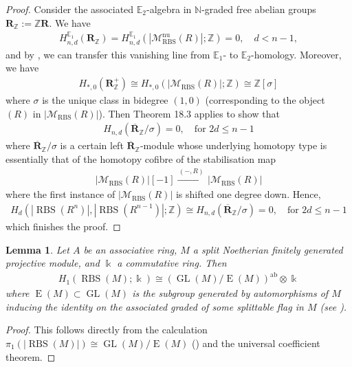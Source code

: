 \documentclass[12pt, reqno]{amsart}
\theoremstyle{plain}
\newtheorem{lemma}[theorem]{Lemma}
\theoremstyle{definition}
\newcommand{\N}{\mathbb N}
\newcommand{\Z}{\mathbb Z}
\begin{document}
\begin{proof}
Consider the associated $\mathbb{E}_2$-algebra in $\N$-graded free abelian groups $\mathbf{R}_\Z:=\Z\mathbf{R}$. We have
\begin{align*}
H_{n,d}^{\mathbb{E}_1}(\mathbf{R}_\Z)=H_{n,d}^{\mathbb{E}_1}(|\mathscr{M}_{\operatorname{RBS}}^{\operatorname{nu}}(R)|;\Z)=0,\quad d< n-1,
\end{align*}
and by \cite[Theorem 14.4]{GalatiusKupersRandalWilliams}, we can transfer this vanishing line from $\mathbb{E}_1$- to $\mathbb{E}_2$-homology. Moreover, we have
\begin{align*}
H_{\ast,0}(\mathbf{R}_\Z^+)\cong H_{\ast,0}(|\mathscr{M}_{\operatorname{RBS}}(R)|;\Z)\cong \Z[\sigma]
\end{align*}
where $\sigma$ is the unique class in bidegree $(1,0)$ (corresponding to the object $(R)$ in $|\mathscr{M}_{\operatorname{RBS}}(R)|$). Then Theorem 18.3 applies to show that
\begin{align*}
H_{n,d}(\overline{\mathbf{R}}_\Z/\sigma)=0,\quad \text{for }2d\leq n-1
\end{align*}
where  $\overline{\mathbf{R}}_\Z/\sigma$ is a certain left $\overline{\mathbf{R}}_\Z$-module whose underlying homotopy type is essentially that of the homotopy cofibre of the stabilisation map
\begin{align*}
|\mathscr{M}_{\operatorname{RBS}}(R)|[-1]\xrightarrow{\,(-,R)\,} |\mathscr{M}_{\operatorname{RBS}}(R)|
\end{align*}
where the first instance of $|\mathscr{M}_{\operatorname{RBS}}(R)|$ is shifted one degree down. Hence,
\begin{align*}
H_d(|\operatorname{RBS}(R^n)|,|\operatorname{RBS}(R^{n-1})|;\Z)\cong H_{n,d}(\overline{\mathbf{R}}_\Z/\sigma)=0 ,\quad \text{for }2d\leq n-1
\end{align*}
which finishes the proof.
\end{proof}

\begin{lemma}\label{H1 of RBS}
Let $A$ be an associative ring, $M$ a split Noetherian finitely generated projective module, and $\Bbbk$ a commutative ring. Then
\begin{align*}
H_1(\operatorname{RBS}(M); \Bbbk)\cong (\operatorname{GL}(M)/\operatorname{E}(M))^{\operatorname{ab}}\otimes \Bbbk
\end{align*}
where $\operatorname{E}(M)\subset \operatorname{GL}(M)$ is the subgroup generated by automorphisms of $M$ inducing the identity on the associated graded of \textit{some} splittable flag in $M$ (see \cite[Theorem 5.9]{ClausenOrsnesJansen}).
\end{lemma}
\begin{proof}
This follows directly from the calculation $\pi_1(|\operatorname{RBS}(M)|)\cong \operatorname{GL}(M)/\operatorname{E}(M)$ (\cite[Theorem 5.9]{ClausenOrsnesJansen}) and the universal coefficient theorem.
\end{proof}
\end{document}
